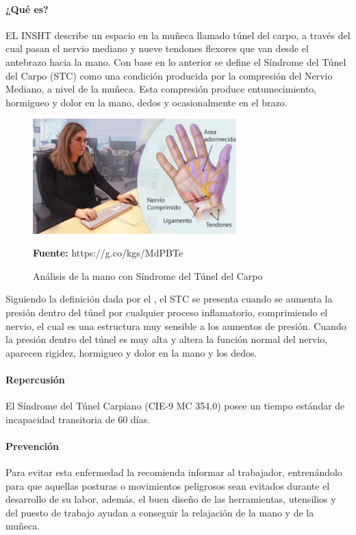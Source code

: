 \paragraph{¿Qué es?}
EL INSHT describe un espacio en la muñeca llamado túnel del carpo, a través del cual pasan el nervio mediano y nueve tendones flexores que van desde el antebrazo hacia la mano\parencite[1]{INSHT2017SindromeCarpiano}. Con base en lo anterior se define el Síndrome del Túnel del Carpo (STC) como una condición producida por la compresión del Nervio Mediano, a nivel de la muñeca. Esta compresión produce entumecimiento, hormigueo y dolor en la mano, dedos y ocasionalmente en el brazo. \parencite[1]{INSHT2017SindromeCarpiano}

\begin{figure}[H]
    \centering
    \includegraphics[width=0.7\textwidth]{Anexos/LATEX/chapters/images/STC.jpg}
    \caption{Análisis de la mano con Síndrome del Túnel del Carpo}
    \small{\textbf{Fuente:} https://g.co/kgs/MdPBTe}
    \label{STC}
\end{figure}

Siguiendo la definición dada por el \parencite{INSHT2017SindromeCarpiano}, el STC se presenta cuando se aumenta la presión dentro del túnel por cualquier proceso inflamatorio, comprimiendo el nervio, el cual es una estructura muy sensible a los aumentos de presión. Cuando la presión dentro del túnel es muy alta y altera la función normal del nervio, aparecen rigidez, hormigueo y dolor en la mano y los dedos.
\paragraph{Repercusión}
El Síndrome del Túnel Carpiano (CIE-9 MC 354.0) posee un tiempo estándar de incapacidad transitoria de 60 días\parencite[6]{INSHT2017SindromeCarpiano}.
\paragraph{Prevención}
Para evitar esta enfermedad la \parencite{FundacionSantaFedeBogota2016SindromeTratarlo} recomienda informar al trabajador, entrenándolo para que aquellas posturas o movimientos peligrosos sean evitados durante el desarrollo de su labor, además, el buen diseño de las herramientas, utensilios y del puesto de trabajo ayudan a conseguir la relajación de la mano y de la muñeca.

